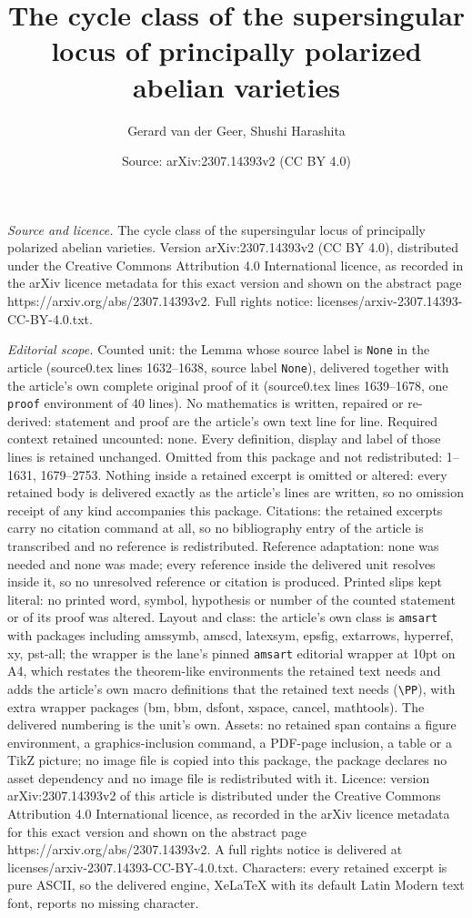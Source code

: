 \documentclass[10pt,a4paper]{amsart}
\title[The cycle class of the supersingular locus of principally po]{The cycle class of the supersingular locus of principally polarized abelian varieties}
\author{Gerard van der Geer, Shushi Harashita}
\date{Source: arXiv:2307.14393v2 (CC BY 4.0)}
\begin{document}
\maketitle

\noindent\emph{Source and licence.} The cycle class of the supersingular locus of principally polarized abelian varieties. Version arXiv:2307.14393v2 (CC BY 4.0), distributed under the Creative Commons Attribution 4.0 International licence, as recorded in the arXiv licence metadata for this exact version and shown on the abstract page https://arxiv.org/abs/2307.14393v2. Full rights notice: licenses/arxiv-2307.14393-CC-BY-4.0.txt.\par\smallskip

\noindent\textit{Editorial scope.} Counted unit: the Lemma whose source label is \texttt{None} in the article (source0.tex lines 1632--1638, source label \texttt{None}), delivered together with the article's own complete original proof of it (source0.tex lines 1639--1678, one \texttt{proof} environment of 40 lines). No mathematics is written, repaired or re-derived: statement and proof are the article's own text line for line. Required context retained uncounted: none. Every definition, display and label of those lines is retained unchanged. Omitted from this package and not redistributed: 1--1631, 1679--2753. Nothing inside a retained excerpt is omitted or altered: every retained body is delivered exactly as the article's lines are written, so no omission receipt of any kind accompanies this package. Citations: the retained excerpts carry no citation command at all, so no bibliography entry of the article is transcribed and no reference is redistributed. Reference adaptation: none was needed and none was made; every reference inside the delivered unit resolves inside it, so no unresolved reference or citation is produced. Printed slips kept literal: no printed word, symbol, hypothesis or number of the counted statement or of its proof was altered. Layout and class: the article's own class is \texttt{amsart} with packages including amssymb, amscd, latexsym, epsfig, extarrows, hyperref, xy, pst-all; the wrapper is the lane's pinned \texttt{amsart} editorial wrapper at 10pt on A4, which restates the theorem-like environments the retained text needs and adds the article's own macro definitions that the retained text needs (\texttt{\textbackslash PP}), with extra wrapper packages (bm, bbm, dsfont, xspace, cancel, mathtools). The delivered numbering is the unit's own. Assets: no retained span contains a figure environment, a graphics-inclusion command, a PDF-page inclusion, a table or a TikZ picture; no image file is copied into this package, the package declares no asset dependency and no image file is redistributed with it. Licence: version arXiv:2307.14393v2 of this article is distributed under the Creative Commons Attribution 4.0 International licence, as recorded in the arXiv licence metadata for this exact version and shown on the abstract page https://arxiv.org/abs/2307.14393v2. A full rights notice is delivered at licenses/arxiv-2307.14393-CC-BY-4.0.txt. Characters: every retained excerpt is pure ASCII, so the delivered engine, XeLaTeX with its default Latin Modern text font, reports no missing character.
\end{document}
